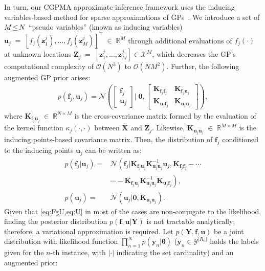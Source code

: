 \documentclass[journal]{IEEEtran}
\providecommand{\ve}[1]{{\bm{#1}}}%
\providecommand{\mat}[1]{{\bm{#1}}} %
\newcommand{\Real}{\mathbb{R}}
\DeclareMathOperator{\en}{\!\,\in\!\,}
\DeclareMathOperator{\igual}{\!\,=\!\,}
\providecommand{\s}[1]{\negthinspace#1\negthinspace}%
\providecommand{\ve}[1]{{\mathbf{#1}}}
\providecommand{\mat}[1]{{\mathbf{#1}}}
\newcommand{\gauss}{\mathcal{N}} %
\begin{document}
In turn, our CGPMA approximate inference framework uses the inducing variables-based method for sparse approximations of GPs~\cite{hensman2015scalable}. We introduce a set of $M\s{\leq}N$ ``pseudo variables'' (known as inducing variables) $\ve{u}_j \igual [f_j(\ve{z}_1^j), \dots , f_j(\ve{z}_M^j)]^{\top}\en \Real^{M}$ through additional evaluations of $f_j(\cdot)$ at unknown locations $\mat{Z}_j \igual [\ve{z}_1^j, \dots , \ve{z}_M^j]\in \mathcal{X}^{M}$, which decreases the GP's computational complexity of $\mathcal{O}(N^3)$ to $\mathcal{O}(NM^2)$. Further, the following augmented GP prior arises:
\begin{align}
p(\ve{f}_j,\ve{u}_j) = \gauss\left(\begin{bmatrix}
\ve{f}_j\\\ve{u}_j\end{bmatrix} \Bigg|\; \mathbf{0}, \begin{bmatrix}
\mat{K}_{\ve{f}_j\ve{f}_j} & \mat{K}_{\ve{f}_j\ve{u}_j}\\ \mat{K}_{\ve{u}_j\ve{f}_j} & \mat{K}_{\ve{u}_j\ve{u}_j}
\end{bmatrix}\right),
\end{align}
where $\mat{K}_{\ve{f}_j\ve{u}_j}\en\Real^{N\times M}$ is the cross-covariance matrix formed by the evaluation of the kernel function $\kappa_j(\cdot, \cdot)$ between $\mat{X}$ and $\mat{Z}_j$. Likewise, $\mat{K}_{\ve{u}_j\ve{u}_j}\en\Real^{M\times M}$ is the inducing points-based covariance matrix. Then, the distribution of $\ve{f}_j$ conditioned to the inducing points $\ve{u}_j$ can be written as:
\begin{align}
\label{eq:FgU}
p(\ve{f}_j|\ve{u}_j) =&\gauss\left(\ve{f}_j|\mat{K}_{\ve{f}_j\ve{u}_j}\mat{K}_{\ve{u}_j\ve{u}_j}^{-1}\ve{u}_j,\mat{K}_{\ve{f}_j\ve{f}_j}-\cdots\right.\\ \nonumber
&\left.\cdots-\mat{K}_{\ve{f}_j\ve{u}_j}\mat{K}_{\ve{u}_j\ve{u}_j}^{-1}\mat{K}_{\ve{u}_j\ve{f}_j}\right),\\
p(\ve{u}_j) =& \gauss\left(\ve{u}_j|\ve{0}, \mat{K}_{\ve{u}_j\ve{u}_j}\right).
\label{eq:U}
\end{align}
Given that \cref{eq:FgU,eq:U} in most of the cases are non-conjugate to the likelihood, finding the posterior distribution $p({\ve{f}},\mathbf{u}|\mathbf{Y})$ is not tractable analytically; therefore, a variational approximation is required. Let $p(\mat{Y},{\ve{f}},{\ve{u}})$ be a joint distribution with likelihood function $\prod_{n=1}^{N}p(\ve{y}_n|\bm{\theta})$ ($\ve{y}_n\in \mathcal{Y}^{|R_n|}$ holds the labels given for the $n$-th instance, with $|\cdot|$ indicating the set cardinality) and an augmented prior:
\end{document}
